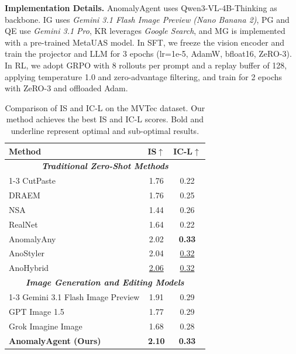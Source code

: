 \documentclass[sigconf]{acmart}
\begin{document}
\noindent\textbf{Implementation Details.}
AnomalyAgent uses Qwen3-VL-4B-Thinking as backbone\cite{DBLP:journals/corr/abs-2511-21631}. 
IG uses \emph{Gemini 3.1 Flash Image Preview (Nano Banana 2)}, PG and QE use \emph{Gemini 3.1 Pro}, KR leverages \emph{Google Search}, and MG is implemented with a pre-trained MetaUAS\cite{DBLP:conf/nips/Gao24} model. 
In SFT, we freeze the vision encoder and train the projector and LLM for 3 epochs (lr=1e-5, AdamW, bfloat16, ZeRO-3). In RL, we adopt GRPO with 8 rollouts per prompt and a replay buffer of 128, applying temperature 1.0 and zero-advantage filtering, and train for 2 epochs with ZeRO-3 and offloaded Adam.

\begin{table}[t]
\centering
\caption{Comparison of IS and IC-L on the MVTec dataset. Our method achieves the best IS and IC-L scores. Bold and underline represent optimal and sub-optimal results.}
\label{tab:isil}
\small
\setlength{\tabcolsep}{8pt} %
\begin{tabular}{l|c|c}
\toprule
\textbf{Method} & \textbf{IS$\uparrow$} & \textbf{IC-L$\uparrow$} \\
\midrule
\multicolumn{3}{c}{\textbf{\textit{Traditional Zero-Shot Methods}}} \\
\cmidrule(lr){1-3}
CutPaste\cite{DBLP:conf/cvpr/LiSYP21} & 1.76 & 0.22 \\
DRAEM\cite{DBLP:conf/iccv/ZavrtanikKS21} & 1.76 & 0.25 \\
NSA\cite{DBLP:conf/eccv/SchluterTHK22} & 1.44 & 0.26 \\
RealNet\cite{DBLP:conf/cvpr/Zhang0Z24} & 1.64 & 0.22 \\
AnomalyAny\cite{DBLP:conf/cvpr/SunCDF25} & 2.02 & \textbf{0.33} \\
AnoStyler\cite{DBLP:journals/corr/abs-2511-06687} & 2.04 & \underline{0.32} \\
AnoHybrid\cite{DBLP:conf/cvpr/Zhao25} & \underline{2.06} & \underline{0.32} \\
\midrule
\multicolumn{3}{c}{\textbf{\textit{Image Generation and Editing Models}}} \\
\cmidrule(lr){1-3}
Gemini 3.1 Flash Image Preview & 1.91 & 0.29 \\
GPT Image 1.5 & 1.77 & 0.29 \\
Grok Imagine Image & 1.68 & 0.28 \\
\midrule
\rowcolor{cyan!5}
\textbf{AnomalyAgent (Ours)} & \textbf{2.10} & \textbf{0.33} \\
\bottomrule
\end{tabular}
\end{table}
\end{document}
